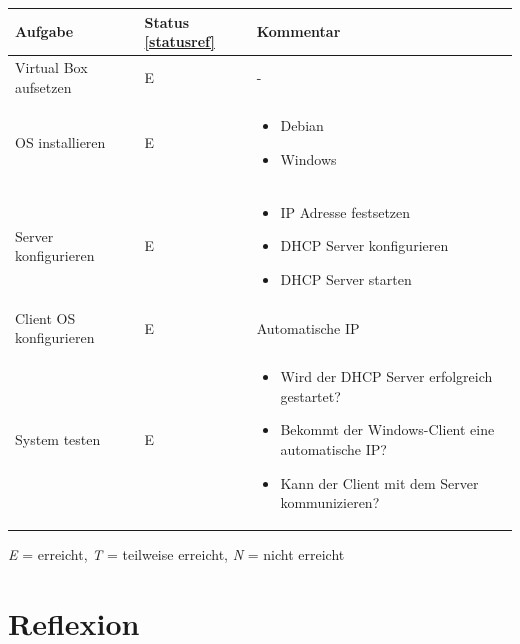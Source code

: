 \documentclass[12pt,a4paper,twoside,titlepage]{article}
\begin{document}
        \begin{tabular}{|l|l|p{5cm}|}
          \hline
          \textbf{Aufgabe} & \textbf{Status \ref{statusref}} & \textbf{Kommentar} \\\hline
          Virtual Box aufsetzen & E & - \\\hline
          OS installieren & E & \begin{itemize}
          \item Debian
          \item Windows
          \end{itemize} \\\hline
          Server konfigurieren & E & \begin{itemize}
          	\item IP Adresse festsetzen
          	\item DHCP Server konfigurieren
          	\item DHCP Server starten
          \end{itemize}\\\hline 
          Client OS konfigurieren & E & Automatische IP \\\hline
          System testen & E & \begin{itemize}
          	\item Wird der DHCP Server erfolgreich gestartet?
          	\item Bekommt der Windows-Client eine automatische IP?
          	\item Kann der Client mit dem Server kommunizieren?
          \end{itemize}\\\hline
        \end{tabular}

        \label{statusref}
        \textit{E} = erreicht, \textit{T} = teilweise erreicht, \textit{N} = nicht erreicht 
        
        \section{Reflexion}
        
        
\end{document}
